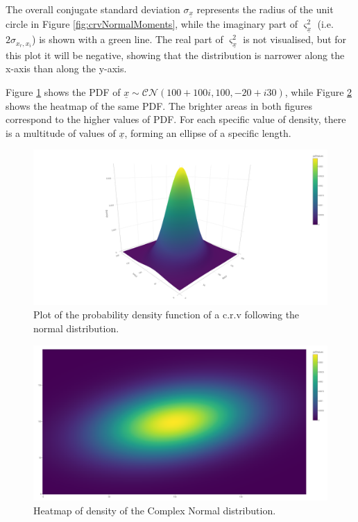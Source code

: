 \documentclass[
]{book}
\begin{document}
The overall conjugate standard deviation \(\sigma_{\underline{x}}\) represents the radius of the unit circle in Figure \ref{fig:crvNormalMoments}, while the imaginary part of \(\varsigma_{\underline{x}}^2\) (i.e.~\(2 \sigma_{x_r, x_i}\)) is shown with a green line. The real part of \(\varsigma_{\underline{x}}^2\) is not visualised, but for this plot it will be negative, showing that the distribution is narrower along the x-axis than along the y-axis.

Figure \ref{fig:plotlyCNormal} shows the PDF of \(\underline{x} \sim \mathcal{CN}(100+100i,100,-20+i30)\), while Figure \ref{fig:plotlyCNormalHeatmap} shows the heatmap of the same PDF. The brighter areas in both figures correspond to the higher values of PDF. For each specific value of density, there is a multitude of values of \(\underline{x}\), forming an ellipse of a specific length.

\begin{figure}
\centering
\includegraphics{./images/plotlyCNormal.png}
\caption{\label{fig:plotlyCNormal}Plot of the probability density function of a c.r.v following the normal distribution.}
\end{figure}

\begin{figure}
\centering
\includegraphics{./images/plotlyCNormalHeatmap.png}
\caption{\label{fig:plotlyCNormalHeatmap}Heatmap of density of the Complex Normal distribution.}
\end{figure}
\end{document}
